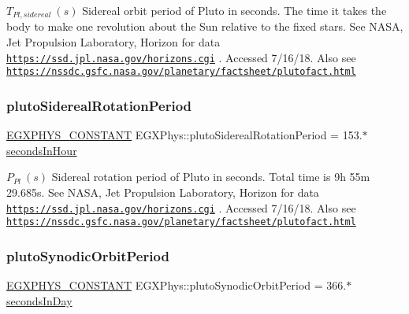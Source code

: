$ T_{Pl,sidereal} \ (s)$ Sidereal orbit period of Pluto in seconds. The time it takes the body to make one revolution about the Sun relative to the fixed stars. See N\+A\+SA, Jet Propulsion Laboratory, Horizon for data \href{https://ssd.jpl.nasa.gov/horizons.cgi}{\tt https\+://ssd.\+jpl.\+nasa.\+gov/horizons.\+cgi} . Accessed 7/16/18. Also see \href{https://nssdc.gsfc.nasa.gov/planetary/factsheet/plutofact.html}{\tt https\+://nssdc.\+gsfc.\+nasa.\+gov/planetary/factsheet/plutofact.\+html} \mbox{\label{group___e_g_x_phys-_constants-_astrophysics-_solar_system-_pluto-_orbit_ga4c42f3baa2194f4c57c975114089e5ac}} 
\subsubsection{\texorpdfstring{pluto\+Sidereal\+Rotation\+Period}{plutoSiderealRotationPeriod}}
{\footnotesize\ttfamily \mbox{\hyperlink{group___e_g_x_phys-_constants-_macros_ga76980d288494ce1714c9ac68a95ba702}{E\+G\+X\+P\+H\+Y\+S\+\_\+\+C\+O\+N\+S\+T\+A\+NT}} E\+G\+X\+Phys\+::pluto\+Sidereal\+Rotation\+Period = 153.$\ast$\mbox{\hyperlink{namespace_e_g_x_phys_a7c3165cd93e36f1fb8e9fef80f117bef}{seconds\+In\+Hour}}}

$ P_{Pl} \ (s)$ Sidereal rotation period of Pluto in seconds. Total time is 9h 55m 29.\+685s. See N\+A\+SA, Jet Propulsion Laboratory, Horizon for data \href{https://ssd.jpl.nasa.gov/horizons.cgi}{\tt https\+://ssd.\+jpl.\+nasa.\+gov/horizons.\+cgi} . Accessed 7/16/18. Also see \href{https://nssdc.gsfc.nasa.gov/planetary/factsheet/plutofact.html}{\tt https\+://nssdc.\+gsfc.\+nasa.\+gov/planetary/factsheet/plutofact.\+html} \mbox{\label{group___e_g_x_phys-_constants-_astrophysics-_solar_system-_pluto-_orbit_gab8815c4d9ce47f1210ae6bc573461f61}} 
\subsubsection{\texorpdfstring{pluto\+Synodic\+Orbit\+Period}{plutoSynodicOrbitPeriod}}
{\footnotesize\ttfamily \mbox{\hyperlink{group___e_g_x_phys-_constants-_macros_ga76980d288494ce1714c9ac68a95ba702}{E\+G\+X\+P\+H\+Y\+S\+\_\+\+C\+O\+N\+S\+T\+A\+NT}} E\+G\+X\+Phys\+::pluto\+Synodic\+Orbit\+Period = 366.$\ast$\mbox{\hyperlink{namespace_e_g_x_phys_a93d2a00d75411b58cbf63ab3fd1f8bc2}{seconds\+In\+Day}}}

